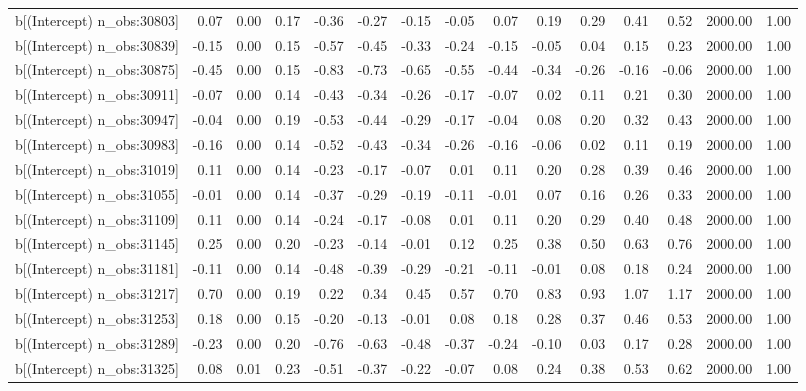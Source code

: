 \begin{table}[ht]
\begin{tabular}{rrrrrrrrrrrrrrr}
  b[(Intercept) n\_obs:30803] & 0.07 & 0.00 & 0.17 & -0.36 & -0.27 & -0.15 & -0.05 & 0.07 & 0.19 & 0.29 & 0.41 & 0.52 & 2000.00 & 1.00 \\ 
  b[(Intercept) n\_obs:30839] & -0.15 & 0.00 & 0.15 & -0.57 & -0.45 & -0.33 & -0.24 & -0.15 & -0.05 & 0.04 & 0.15 & 0.23 & 2000.00 & 1.00 \\ 
  b[(Intercept) n\_obs:30875] & -0.45 & 0.00 & 0.15 & -0.83 & -0.73 & -0.65 & -0.55 & -0.44 & -0.34 & -0.26 & -0.16 & -0.06 & 2000.00 & 1.00 \\ 
  b[(Intercept) n\_obs:30911] & -0.07 & 0.00 & 0.14 & -0.43 & -0.34 & -0.26 & -0.17 & -0.07 & 0.02 & 0.11 & 0.21 & 0.30 & 2000.00 & 1.00 \\ 
  b[(Intercept) n\_obs:30947] & -0.04 & 0.00 & 0.19 & -0.53 & -0.44 & -0.29 & -0.17 & -0.04 & 0.08 & 0.20 & 0.32 & 0.43 & 2000.00 & 1.00 \\ 
  b[(Intercept) n\_obs:30983] & -0.16 & 0.00 & 0.14 & -0.52 & -0.43 & -0.34 & -0.26 & -0.16 & -0.06 & 0.02 & 0.11 & 0.19 & 2000.00 & 1.00 \\ 
  b[(Intercept) n\_obs:31019] & 0.11 & 0.00 & 0.14 & -0.23 & -0.17 & -0.07 & 0.01 & 0.11 & 0.20 & 0.28 & 0.39 & 0.46 & 2000.00 & 1.00 \\ 
  b[(Intercept) n\_obs:31055] & -0.01 & 0.00 & 0.14 & -0.37 & -0.29 & -0.19 & -0.11 & -0.01 & 0.07 & 0.16 & 0.26 & 0.33 & 2000.00 & 1.00 \\ 
  b[(Intercept) n\_obs:31109] & 0.11 & 0.00 & 0.14 & -0.24 & -0.17 & -0.08 & 0.01 & 0.11 & 0.20 & 0.29 & 0.40 & 0.48 & 2000.00 & 1.00 \\ 
  b[(Intercept) n\_obs:31145] & 0.25 & 0.00 & 0.20 & -0.23 & -0.14 & -0.01 & 0.12 & 0.25 & 0.38 & 0.50 & 0.63 & 0.76 & 2000.00 & 1.00 \\ 
  b[(Intercept) n\_obs:31181] & -0.11 & 0.00 & 0.14 & -0.48 & -0.39 & -0.29 & -0.21 & -0.11 & -0.01 & 0.08 & 0.18 & 0.24 & 2000.00 & 1.00 \\ 
  b[(Intercept) n\_obs:31217] & 0.70 & 0.00 & 0.19 & 0.22 & 0.34 & 0.45 & 0.57 & 0.70 & 0.83 & 0.93 & 1.07 & 1.17 & 2000.00 & 1.00 \\ 
  b[(Intercept) n\_obs:31253] & 0.18 & 0.00 & 0.15 & -0.20 & -0.13 & -0.01 & 0.08 & 0.18 & 0.28 & 0.37 & 0.46 & 0.53 & 2000.00 & 1.00 \\ 
  b[(Intercept) n\_obs:31289] & -0.23 & 0.00 & 0.20 & -0.76 & -0.63 & -0.48 & -0.37 & -0.24 & -0.10 & 0.03 & 0.17 & 0.28 & 2000.00 & 1.00 \\ 
  b[(Intercept) n\_obs:31325] & 0.08 & 0.01 & 0.23 & -0.51 & -0.37 & -0.22 & -0.07 & 0.08 & 0.24 & 0.38 & 0.53 & 0.62 & 2000.00 & 1.00 \\ 

\end{tabular}
\end{table}
